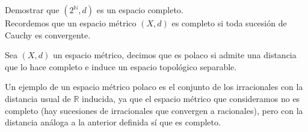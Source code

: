 \begin{ejercicio}
    Demostrar que $(2^\mathbb{N}, d)$ es un espacio completo. \\

    \noindent
    Recordemos que un espacio métrico $(X,d)$ es completo si toda sucesión de Cauchy es convergente.
\end{ejercicio}

\begin{definicion}[Polaco]
    Sea $(X,d)$ un espacio métrico, decimos que es polaco si admite una distancia que lo hace completo e induce un espacio topológico separable.
\end{definicion}

\begin{ejemplo}
    Un ejemplo de un espacio métrico polaco es el conjunto de los irracionales con la distancia usual de $\mathbb{R}$ inducida, ya que el espacio métrico que consideramos no es completo (hay sucesiones de irracionales que convergen a racionales), pero con la distancia análoga a la anterior definida sí que es completo.
\end{ejemplo}

